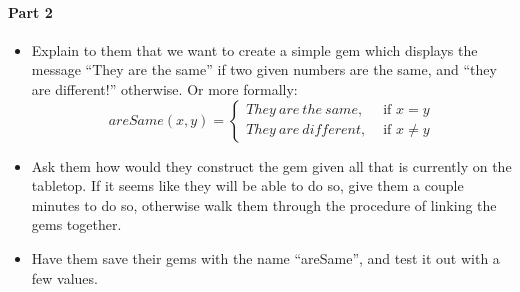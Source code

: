 {		\paragraph{Part 2}
		
		\begin{itemize}
			\item Explain to them that we want to create a simple gem which displays the message ``They are the same'' if two given numbers are the same, and ``they are different!'' otherwise.  Or more formally:
$$
areSame\left(x,y\right) = \left\{ \begin{array}{cc}They\:are\:the\:same,&\mbox{ if } x=y\\They\:are\:different,&\mbox{ if } x \neq y\end{array}\right.
$$
			\item Ask them how would they construct the gem given all that is currently on the tabletop.  If it seems like they will be able to do so, give them a couple minutes to do so, otherwise walk them through the procedure of linking the gems together.
			\item Have them save their gems with the name ``areSame'', and test it out with a few values.
		\end{itemize}
	}	